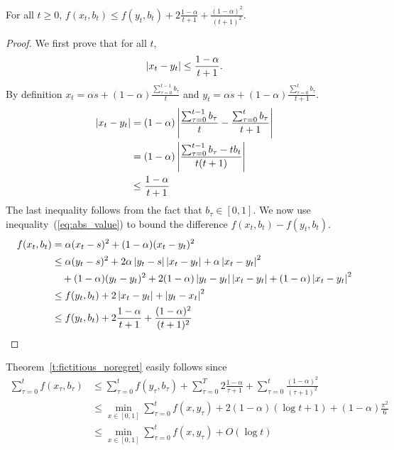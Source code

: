 \begin{lemma}\label{l:no_regret_lemma}
  For all $t\geq 0$,
  \(f(x_t,b_t) \leq f(y_t,b_t) + 2\frac{1-\alpha}{t+1} + \frac{(1-\alpha)^2}{(t+1)^2}\).
\end{lemma}
\begin{proof}
  We first prove that for all $t$,
  \begin{equation}\label{eq:abs_value}
    \left|x_t - y_t \right| \leq \frac{1-\alpha}{t+1}.
  \end{equation}
  By definition
  \(x_t = \alpha s + (1-\alpha)\frac{\sum_{\tau = 0}^{t-1} b_\tau}{t}\)
  and
  \( y_t = \alpha s + (1-\alpha)\frac{\sum_{\tau = 0}^t b_\tau}{t+1}\).
  \begin{align*}
    \left|x_t - y_t\right|
    &=
    (1-\alpha)\left|\frac{\sum_{\tau = 0}^{t-1}b_\tau}{t}
    - \frac{\sum_{\tau = 0}^t b_\tau}{t+1}\right|\\
    &=
    (1-\alpha)\left|\frac{\sum_{\tau = 0}^{t-1}b_\tau -tb_t}{t(t+1)}\right|\\
    &\leq
    \frac{1-\alpha}{t+1}
  \end{align*}
  The last inequality follows from the fact that $b_\tau \in [0,1]$.
  We now use inequality~(\ref{eq:abs_value}) to bound the difference
  \( f(x_t,b_t) - f(y_t,b_t) \).
  \begin{align*}
    f(x_t,b_t)
    &=
    \alpha(x_t - s)^2 + (1 - \alpha)(x_t - y_t)^2 \\
    &\leq
    \alpha(y_t - s)^2 + 2\alpha\left|y_t -
    s\right|\left|x_t - y_t\right| + \alpha \left|x_t - y_t\right|^2 \\
    &\quad + (1-\alpha)(y_t - y_t)^2 +
    2(1-\alpha)\left|y_t - y_t\right|\left|x_t-y_t\right| + (1 - \alpha)\left|x_t - y_t\right|^2\\
    &\leq
    f(y_t,b_t) + 2\left|x_t - y_t\right| + \left|y_t - x_t\right|^2\\
    &\leq
    f(y_t,b_t) + 2\frac{1-\alpha}{t+1} + \frac{(1-\alpha)^2}{(t+1)^2}
  \end{align*}
\end{proof}

Theorem~\ref{t:fictitious_noregret} easily follows since
\begin{align*}
  \sum_{\tau=0}^t f(x_\tau,b_\tau)
  &\leq
  \sum_{\tau=0}^t f(y_\tau,b_\tau) + \sum_{\tau=0}^T 2\frac{1-\alpha}{\tau+1} +
  \sum_{\tau=0}^t \frac{(1-\alpha)^2}{(\tau+1)^2}\\
  &\leq
  \min_{ x \in [0,1]} \sum_{\tau=0}^t f(x,y_\tau) +
  2(1-\alpha)(\log t + 1) + (1-\alpha)\frac{\pi^2}{6}\\
  &\leq
  \min_{ x \in [0,1]} \sum_{\tau=0}^t f(x,y_\tau) + O(\log t)
\end{align*}
